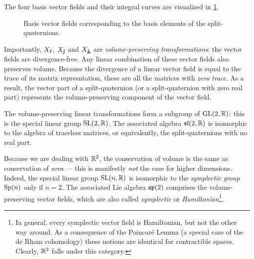 The four basis vector fields and their integral curves are visualized in \cref{fig:basis_vf}.
\begin{figure}[ht!]
    \centering
    
    \caption{Basis vector fields corresponding to the basis elements of the split-quaternions.}
    \label{fig:basis_vf}
\end{figure}

Importantly, $X_{\quati}$, $X_{\quatj}$ and $X_{\quatk}$ are \emph{volume-preserving transformations}: the vector fields are divergence-free. Any linear combination of these vector fields also preserves volume. Because the divergence of a linear vector field is equal to the trace of its matrix represntation, these are all the matrices with \emph{zero trace}. As a result, the vector part of a split-quaternion (or a split-quaternion with zero real part) represents the volume-preserving component of the vector field. 

The volume-preserving linear transformations form a subgroup of $\glgroup{2}{\real}$: this is the special linear group $\slgroup{2}{\real}$. The associated algebra $\slalg{2}{\real}$ is isomorphic to the algebra of traceless matrices, or equivalently, the split-quaternions with no real part.

Because we are dealing with $\real^2$, the conservation of volume is the same as conservation of \emph{area} --- this is manifestly \emph{not} the case for higher dimensions.  Indeed, the special linear group $\slgroup{n}{\real}$ is isomorphic to the \emph{symplectic group} $\spgroup{n}$ only if $n = 2$. The associated Lie algebra $\spalg{2}$ comprises the volume-preserving vector fields, which are also called \emph{symplectic} or \emph{Hamiltonian}\footnote{In general, every symplectic vector field is Hamiltonian, but not the other way around. As a consequence of the Poincaré Lemma (a special case of the de Rham cohomology) these notions are identical for contractible spaces. Clearly, $\real^2$ falls under this category.}.

